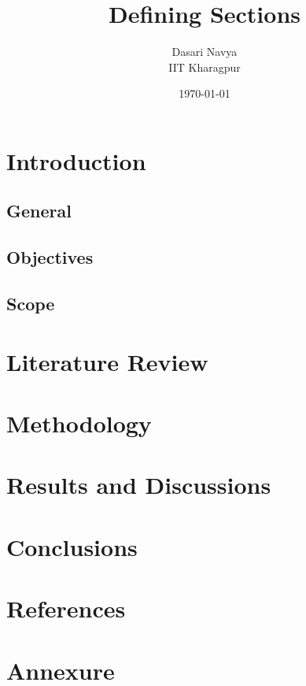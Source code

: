 \documentclass{book}
\title{Defining Sections}
\author{Dasari Navya \\ IIT Kharagpur}
\date{\today}
\begin{document}
	\maketitle
	\tableofcontents
	
	\chapter{Introduction}
	
		\section{General}
	
		\section{Objectives}
	
		\section{Scope}
	
	\chapter{Literature Review}
	
	\chapter{Methodology}
	
	\chapter{Results and Discussions}
	
	\chapter{Conclusions}
	
	\chapter{References}
	
	\chapter{Annexure}
\end{document}
